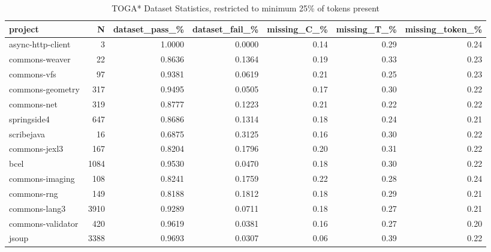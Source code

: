 \begin{table*}
\centering
\caption{TOGA* Dataset Statistics, restricted to minimum 25\% of tokens present}
\label{tab:toga_stats_25}
\begin{tabular}{lrrrrrr}
\toprule
                project &      N &  dataset\_pass\_\% &  dataset\_fail\_\% &  missing\_C\_\% &  missing\_T\_\% &  missing\_token\_\% \\
\midrule
      async-http-client &      3 &          1.0000 &          0.0000 &         0.14 &         0.29 &             0.24 \\
         commons-weaver &     22 &          0.8636 &          0.1364 &         0.19 &         0.33 &             0.23 \\
            commons-vfs &     97 &          0.9381 &          0.0619 &         0.21 &         0.25 &             0.23 \\
       commons-geometry &    317 &          0.9495 &          0.0505 &         0.17 &         0.30 &             0.22 \\
            commons-net &    319 &          0.8777 &          0.1223 &         0.21 &         0.22 &             0.22 \\
            springside4 &    647 &          0.8686 &          0.1314 &         0.18 &         0.24 &             0.21 \\
             scribejava &     16 &          0.6875 &          0.3125 &         0.16 &         0.30 &             0.22 \\
          commons-jexl3 &    167 &          0.8204 &          0.1796 &         0.20 &         0.31 &             0.22 \\
                   bcel &   1084 &          0.9530 &          0.0470 &         0.18 &         0.30 &             0.22 \\
        commons-imaging &    108 &          0.8241 &          0.1759 &         0.22 &         0.28 &             0.24 \\
            commons-rng &    149 &          0.8188 &          0.1812 &         0.18 &         0.29 &             0.21 \\
          commons-lang3 &   3910 &          0.9289 &          0.0711 &         0.18 &         0.27 &             0.21 \\
      commons-validator &    420 &          0.9619 &          0.0381 &         0.16 &         0.27 &             0.20 \\
                  jsoup &   3388 &          0.9693 &          0.0307 &         0.06 &         0.39 &             0.22 \\

\end{tabular}
\end{table*}
